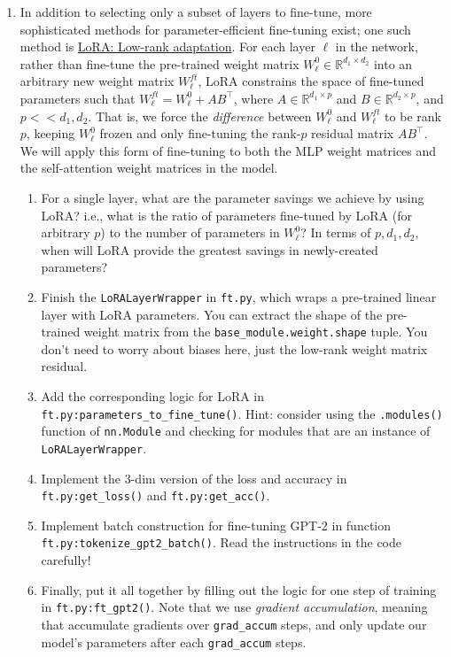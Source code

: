 \documentclass[12pt]{article}
\begin{document}
\begin{enumerate}
        \item In addition to selecting only a subset of layers to fine-tune, more sophisticated methods for parameter-efficient fine-tuning exist; one such method is \href{https://arxiv.org/pdf/2106.09685.pdf}{LoRA: Low-rank adaptation}. For each layer $\ell$ in the network, rather than fine-tune the pre-trained weight matrix $W_\ell^0 \in \mathbb{R}^{d_1\times d_2}$ into an arbitrary new weight matrix $W_\ell^{ft}$, LoRA constrains the space of fine-tuned parameters such that $W_\ell^{ft} = W_\ell^0 + AB^\top$, where $A \in \mathbb{R}^{d_1\times p}$ and $B \in \mathbb{R}^{d_2\times p}$, and $p << d_1,d_2$. That is, we force the \textit{difference} between $W_\ell^0$ and $W_\ell^{ft}$ to be rank $p$, keeping $W_\ell^0$ frozen and only fine-tuning the rank-$p$ residual matrix $AB^\top$. We will apply this form of fine-tuning to both the MLP weight matrices and the self-attention weight matrices in the model.
        \begin{enumerate}
            \item For a single layer, what are the parameter savings we achieve by using LoRA? i.e., what is the ratio of parameters fine-tuned by LoRA (for arbitrary $p$) to the number of parameters in $W_\ell^0$? In terms of $p,d_1,d_2$, when will LoRA provide the greatest savings in newly-created parameters?
            \item Finish the \texttt{LoRALayerWrapper} in \texttt{ft.py}, which wraps a pre-trained linear layer with LoRA parameters. You can extract the shape of the pre-trained weight matrix from the \texttt{base\_module.weight.shape} tuple. You don't need to worry about biases here, just the low-rank weight matrix residual.

            \item Add the corresponding logic for LoRA in \texttt{ft.py:parameters\_to\_fine\_tune()}. Hint: consider using the \texttt{.modules()} function of \texttt{nn.Module} and checking for modules that are an instance of \texttt{LoRALayerWrapper}.
            \item Implement the 3-dim version of the loss and accuracy in \texttt{ft.py:get\_loss()} and \texttt{ft.py:get\_acc()}.
            \item Implement batch construction for fine-tuning GPT-2 in function \texttt{ft.py:\allowbreak tokenize\_\allowbreak gpt2\_batch()}. Read the instructions in the code carefully!
            \item Finally, put it all together by filling out the logic for one step of training in \texttt{ft.py:ft\_gpt2()}. Note that we use \textit{gradient accumulation}, meaning that accumulate gradients over \texttt{grad\_accum} steps, and only update our model's parameters after each \texttt{grad\_accum} steps.
        \end{enumerate}


\end{enumerate}
\end{document}
